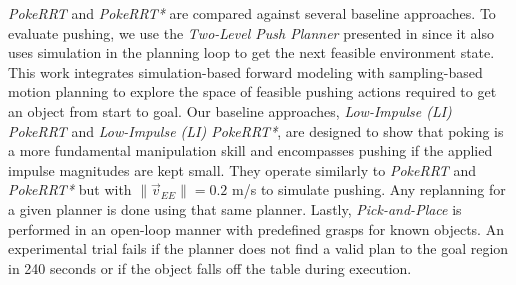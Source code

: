 \textsl{PokeRRT} and \textsl{PokeRRT*} are compared against several baseline approaches. To evaluate pushing, we use the \textsl{Two-Level Push Planner} presented in \cite{zito2012two} since it also uses simulation in the planning loop to get the next feasible environment state. This work integrates simulation-based forward modeling with sampling-based motion planning to explore the space of feasible pushing actions required to get an object from start to goal. Our baseline approaches, \textsl{Low-Impulse (LI) PokeRRT} and \textsl{Low-Impulse (LI) PokeRRT*}, are designed to show that poking is a more fundamental manipulation skill and encompasses pushing if the applied impulse magnitudes are kept small. They operate similarly to \textsl{PokeRRT} and \textsl{PokeRRT*} but with $\|\vec{v}_{EE}\| = 0.2$ m/s to simulate pushing. Any replanning for a given planner is done using that same planner. Lastly, \textsl{Pick-and-Place} is performed in an open-loop manner with predefined grasps for known objects. An experimental trial fails if the planner does not find a valid plan to the goal region in 240 seconds or if the object falls off the table during execution.\vspace{-4pt}
